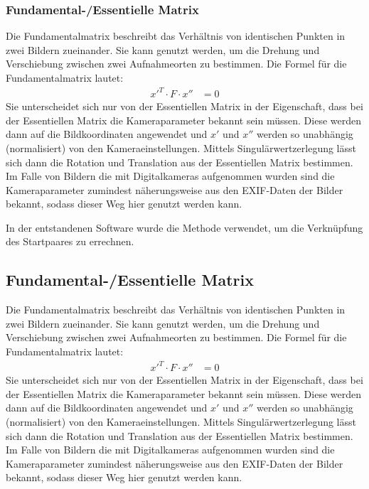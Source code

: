 \documentclass[./00PhotoBox.tex]{subfiles}
\begin{document}
\subsubsection{Fundamental-/Essentielle Matrix}
Die Fundamentalmatrix beschreibt das Verhältnis von identischen Punkten in zwei Bildern zueinander. Sie kann genutzt werden, um die Drehung und Verschiebung zwischen zwei Aufnahmeorten zu bestimmen. Die Formel für die Fundamentalmatrix lautet:
\begin{align}
    x'^T \cdot F \cdot x'' & = 0
\end{align}
Sie unterscheidet sich nur von der Essentiellen Matrix in der Eigenschaft, dass bei der Essentiellen Matrix die Kameraparameter bekannt sein müssen. Diese werden dann auf die Bildkoordinaten angewendet und $x'$ und $x''$ werden so unabhängig (normalisiert) von den Kameraeinstellungen. Mittels Singulärwertzerlegung lässt sich dann die Rotation und Translation aus der Essentiellen Matrix bestimmen. Im Falle von Bildern die mit Digitalkameras aufgenommen wurden sind die Kameraparameter zumindest näherungsweise aus den EXIF-Daten der Bilder bekannt, sodass dieser Weg hier genutzt werden kann. \citep[S. 257]{hartley}

In der entstandenen Software wurde die Methode verwendet, um die Verknüpfung des Startpaares zu errechnen.

\subsection{Fundamental-/Essentielle Matrix}
Die Fundamentalmatrix beschreibt das Verhältnis von identischen Punkten in zwei Bildern zueinander. Sie kann genutzt werden, um die Drehung und Verschiebung zwischen zwei Aufnahmeorten zu bestimmen. Die Formel für die Fundamentalmatrix lautet:
\begin{align}
    x'^T \cdot F \cdot x'' & = 0
\end{align}
Sie unterscheidet sich nur von der Essentiellen Matrix in der Eigenschaft, dass bei der Essentiellen Matrix die Kameraparameter bekannt sein müssen. Diese werden dann auf die Bildkoordinaten angewendet und $x'$ und $x''$ werden so unabhängig (normalisiert) von den Kameraeinstellungen. Mittels Singulärwertzerlegung lässt sich dann die Rotation und Translation aus der Essentiellen Matrix bestimmen. Im Falle von Bildern die mit Digitalkameras aufgenommen wurden sind die Kameraparameter zumindest näherungsweise aus den EXIF-Daten der Bilder bekannt, sodass dieser Weg hier genutzt werden kann. \citep[S. 257]{hartley}
\end{document}
